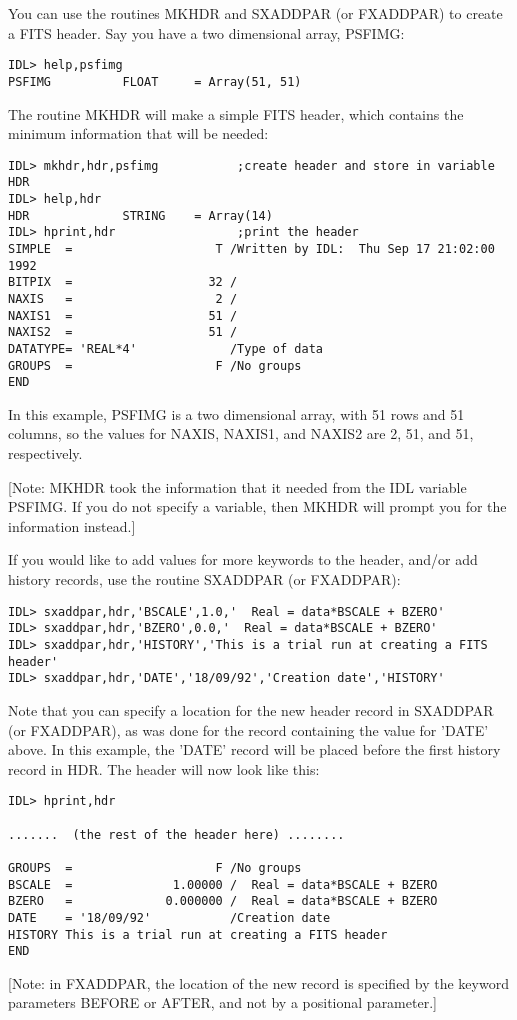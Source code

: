 You can use the routines MKHDR and SXADDPAR (or FXADDPAR) to create a FITS
header. Say you have a two dimensional array, PSFIMG:

\medskip\noindent
\begin{verbatim}
IDL> help,psfimg
PSFIMG          FLOAT     = Array(51, 51)
\end{verbatim}
The routine MKHDR will make a simple FITS header, which contains the
minimum information that will be needed:

\medskip\noindent
\begin{verbatim}
IDL> mkhdr,hdr,psfimg           ;create header and store in variable HDR
IDL> help,hdr			
HDR             STRING    = Array(14)
IDL> hprint,hdr                 ;print the header
SIMPLE  =                    T /Written by IDL:  Thu Sep 17 21:02:00 1992
BITPIX  =                   32 /
NAXIS   =                    2 /
NAXIS1  =                   51 /
NAXIS2  =                   51 /
DATATYPE= 'REAL*4'             /Type of data
GROUPS  =                    F /No groups
END
\end{verbatim}
In this example, PSFIMG is a two dimensional array, with 51 rows and 51
columns, so the values for NAXIS, NAXIS1, and NAXIS2 are 2, 51, and 51,
respectively.
 
[Note: MKHDR took the information that it needed from the IDL variable
PSFIMG. If you do not specify a variable, then MKHDR will prompt you for the
information instead.]
 
If you would like to add values for more keywords to the header, and/or add
history records, use the routine SXADDPAR (or FXADDPAR):

\medskip\noindent
\begin{verbatim}
IDL> sxaddpar,hdr,'BSCALE',1.0,'  Real = data*BSCALE + BZERO'
IDL> sxaddpar,hdr,'BZERO',0.0,'  Real = data*BSCALE + BZERO'
IDL> sxaddpar,hdr,'HISTORY','This is a trial run at creating a FITS header'
IDL> sxaddpar,hdr,'DATE','18/09/92','Creation date','HISTORY'
\end{verbatim}
Note that you can specify a location for the new header record in SXADDPAR
(or FXADDPAR), as was done for the record containing the value for 'DATE'
above. In this example, the 'DATE' record will be placed before the first
history record in HDR. The header will now look like this:

\medskip\noindent
\begin{verbatim}
IDL> hprint,hdr
 
.......  (the rest of the header here) ........
 
GROUPS  =                    F /No groups
BSCALE  =              1.00000 /  Real = data*BSCALE + BZERO
BZERO   =             0.000000 /  Real = data*BSCALE + BZERO
DATE    = '18/09/92'           /Creation date
HISTORY This is a trial run at creating a FITS header
END
\end{verbatim}
[Note: in FXADDPAR, the location of the new record is specified by the
keyword parameters BEFORE or AFTER, and not by a positional parameter.]
 
